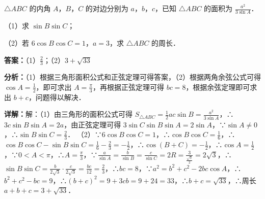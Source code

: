 \begin{question}[points=12]
$\triangle ABC$ 的内角 $A$，$B$，$C$ 的对边分别为 $a$，$b$，$c$，已知 $\triangle ABC$ 的面积为 $\frac{a^2}{3\sin A}$．

（1）求 $\sin B\sin C$；

（2）若 $6\cos B\cos C=1$，$a=3$，求 $\triangle ABC$ 的周长．
\begin{solution}
\textbf{答案：}（1）$\frac{2}{3}$；（2）$3+\sqrt{33}$

\textbf{分析：}（1）根据三角形面积公式和正弦定理可得答案，（2）根据两角余弦公式可得 $\cos A=\frac{1}{2}$，即可求出 $A=\frac{\pi}{3}$，再根据正弦定理可得 $bc=8$，根据余弦定理即可求出 $b+c$，问题得以解决．

\textbf{详解：}解：（1）由三角形的面积公式可得 $S_{\triangle ABC}=\frac{1}{2}ac\sin B=\frac{a^2}{3\sin A}$，∴$3c\sin B\sin A=2a$，由正弦定理可得 $3\sin C\sin B\sin A=2\sin A$，∵$\sin A\neq0$，∴$\sin B\sin C=\frac{2}{3}$．
（2）∵$6\cos B\cos C=1$，∴$\cos B\cos C=\frac{1}{6}$，∴$\cos B\cos C-\sin B\sin C=\frac{1}{6}-\frac{2}{3}=-\frac{1}{2}$，∴$\cos(B+C)=-\frac{1}{2}$，∴$\cos A=\frac{1}{2}$，∵$0<A<\pi$，∴$A=\frac{\pi}{3}$，∵$\frac{a}{\sin A}=\frac{b}{\sin B}=\frac{c}{\sin C}=2R=\frac{3}{\frac{\sqrt{3}}{2}}=2\sqrt{3}$，∴$\sin B\sin C=\frac{b}{2\sqrt{3}}\cdot\frac{c}{2\sqrt{3}}=\frac{bc}{12}=\frac{2}{3}$，∴$bc=8$，∵$a^2=b^2+c^2-2bc\cos A$，∴$b^2+c^2-bc=9$，∴$(b+c)^2=9+3cb=9+24=33$，∴$b+c=\sqrt{33}$，∴周长 $a+b+c=3+\sqrt{33}$．
\end{solution}
\end{question}

